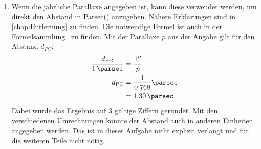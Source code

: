 \begin{enumerate}
	\item Wenn die jährliche Parallaxe angegeben ist, kann diese verwendet werden, um direkt den Abstand in Parsec(\unit{\parsec}) anzugeben. Nähere Erklärungen sind in \cref{chap:Entfernung} zu finden. Die notwendige Formel ist auch in der Formelsammlung~\cite[S.17]{Cornelsen2013} zu finden. Mit der Parallaxe $p$ aus der Angabe gilt für den Abstand $d_{PC}$:
	\begin{align*}
		\frac{d_{\text{PC}}}{\SI{1}{\parsec}}&=\frac{\SI{1}{\arcsecond}}{p}\\
		d_{\text{PC}}&=\frac{1}{\num{0.768}}\unit{\parsec}\\
		&=\SI{1.30}{\parsec}
	\end{align*}
	Dabei wurde das Ergebnis auf 3 gültige Ziffern gerundet. Mit den verschiedenen Umrechnungen könnte der Abstand auch in anderen Einheiten angegeben werden. Das ist in dieser Aufgabe nicht explizit verlangt und für die weiteren Teile nicht nötig. 


\end{enumerate}
